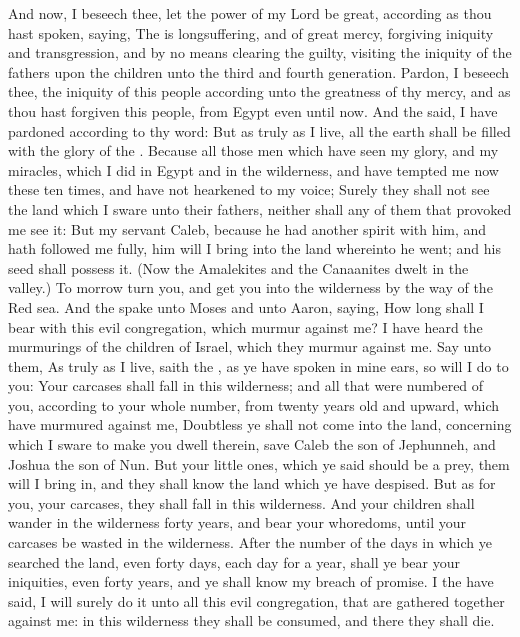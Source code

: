 \begin{biblechapter}
\verse And now, I beseech thee, let the power of my Lord be great, according as thou hast spoken, saying,
\verse The \LORD is longsuffering, and of great mercy, forgiving iniquity and transgression, and by no means clearing the guilty, visiting the iniquity of the fathers upon the children unto the third and fourth generation.
\verse Pardon, I beseech thee, the iniquity of this people according unto the greatness of thy mercy, and as thou hast forgiven this people, from Egypt even until now.
\verse And the \LORD said, I have pardoned according to thy word:
\verse But as truly as I live, all the earth shall be filled with the glory of the \LORD.
\verse Because all those men which have seen my glory, and my miracles, which I did in Egypt and in the wilderness, and have tempted me now these ten times, and have not hearkened to my voice;
\verse Surely they shall not see the land which I sware unto their fathers, neither shall any of them that provoked me see it:
\verse But my servant Caleb, because he had another spirit with him, and hath followed me fully, him will I bring into the land whereinto he went; and his seed shall possess it.
\verse (Now the Amalekites and the Canaanites dwelt in the valley.) To morrow turn you, and get you into the wilderness by the way of the Red sea.
\verse And the \LORD spake unto Moses and unto Aaron, saying,
\verse How long shall I bear with this evil congregation, which murmur against me? I have heard the murmurings of the children of Israel, which they murmur against me.
\verse Say unto them, As truly as I live, saith the \LORD, as ye have spoken in mine ears, so will I do to you:
\verse Your carcases shall fall in this wilderness; and all that were numbered of you, according to your whole number, from twenty years old and upward, which have murmured against me,
\verse Doubtless ye shall not come into the land, concerning which I sware to make you dwell therein, save Caleb the son of Jephunneh, and Joshua the son of Nun.
\verse But your little ones, which ye said should be a prey, them will I bring in, and they shall know the land which ye have despised.
\verse But as for you, your carcases, they shall fall in this wilderness.
\verse And your children shall wander in the wilderness forty years, and bear your whoredoms, until your carcases be wasted in the wilderness.
\verse After the number of the days in which ye searched the land, even forty days, each day for a year, shall ye bear your iniquities, even forty years, and ye shall know my breach of promise.
\verse I the \LORD have said, I will surely do it unto all this evil congregation, that are gathered together against me: in this wilderness they shall be consumed, and there they shall die.

\end{biblechapter}
